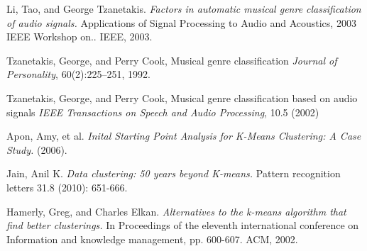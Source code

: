 \begin{thebibliography}{9}
                Li, Tao, and George Tzanetakis. 
                \emph{Factors in automatic musical genre classification of audio signals.} 
                Applications of Signal Processing to Audio and Acoustics, 2003 IEEE Workshop on.. IEEE, 2003.

                Tzanetakis, George, and Perry Cook, Musical genre classification 
                \emph{Journal of Personality},
                60(2):225–251,
                1992.

                Tzanetakis, George, and Perry Cook, Musical genre classification based on audio signals
                \emph{IEEE Transactions on Speech and Audio Processing},
                10.5 (2002)

                Apon, Amy, et al. 
                \emph{Inital Starting Point Analysis for K-Means Clustering: A Case Study.} 
                (2006).

                Jain, Anil K. 
                \emph{Data clustering: 50 years beyond K-means.} 
                Pattern recognition letters 31.8 (2010): 651-666.

                Hamerly, Greg, and Charles Elkan. 
                \emph{Alternatives to the k-means algorithm that find better clusterings.} 
                In Proceedings of the eleventh international conference on Information and knowledge management, pp. 600-607.
                ACM, 2002.

\end{thebibliography}
